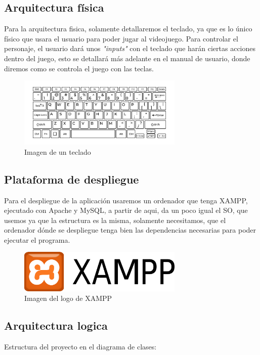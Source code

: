\documentclass[a4paper]{article}
\begin{document}
\subsection{Arquitectura física}
Para la arquitectura fisica, solamente detallaremos el teclado, ya que es lo único físico que usara el usuario para poder jugar al videojuego.
Para controlar el personaje, el usuario dará unos \textit{"inputs"} con el teclado que harán ciertas acciones dentro del juego, esto se detallará más
adelante en el manual de usuario, donde diremos como se controla el juego con las teclas.
\begin{figure}[ht]
    \centering
    \includegraphics[width=0.7\textwidth]{Images/teclado.jpg}
    \caption{Imagen de un teclado}
    \label{fig:teclado}
\end{figure}
\subsection{Plataforma de despliegue}
Para el despliegue de la aplicación usaremos un ordenador que tenga XAMPP, ejecutado con Apache y MySQL, a partir de aqui, da un poco igual el SO, que usemos ya que la estructura es la misma, solamente necesitamos,
que el ordenador dónde se despliegue tenga bien las dependencias necesarias para poder ejecutar el programa.
\begin{figure}[ht]
    \centering
    \includegraphics[width=0.7\textwidth]{Images/Xampp_logo.png}
    \caption{Imagen del logo de XAMPP}
    \label{fig:xampplogo}
\end{figure}
\clearpage
\subsection{Arquitectura logica}
Estructura del proyecto en el diagrama de clases:
\end{document}
